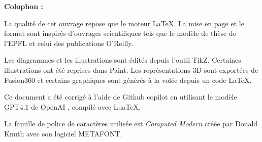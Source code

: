 \clearpage
\Large\textbf{Colophon :}\par\normalsize
\thispagestyle{empty}
La qualité de cet ouvrage repose que le moteur \LaTeX. La mise en page et le format sont inspirés d'ouvrages scientifiques tels que le modèle de thèse de l'EPFL et celui des publications O'Reilly.

Les diagrammes et les illustrations sont édités depuis l'outil TikZ. Certaines illustrations ont été reprises dans Paint. Les représentations 3D sont exportées de Fusion360 et certains graphiques sont générés à la volée depuis un code LaTeX.

Ce document a été corrigé à l'aide de Github copilot en utilisant le modèle GPT4.1 de OpenAI \cite{ChatGPT}, compilé avec \mbox{Lua\TeX}.

La famille de police de caractères utilisée est \emph{Computed Modern} créée par Donald Knuth avec son logiciel METAFONT.

\vfil

